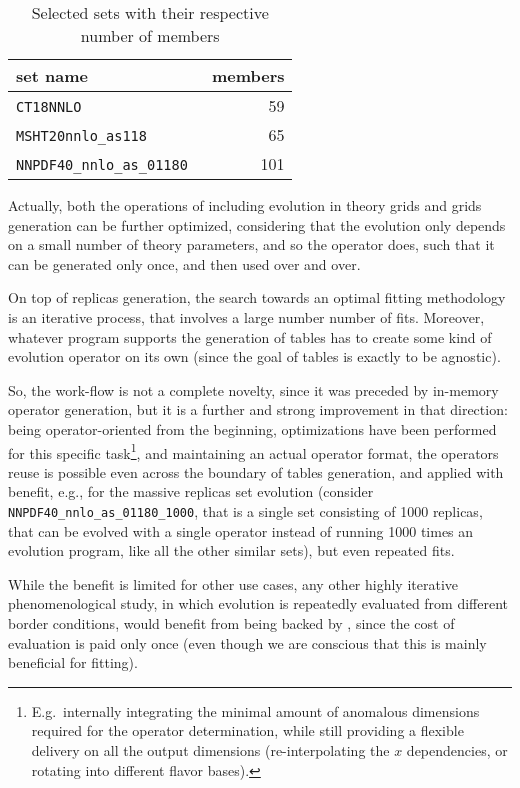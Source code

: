 \begin{table}
    \centering
    \begin{tabular}{lr}
        \pdf{} set name & members \\
        \hline
        \texttt{CT18NNLO}~\cite{Hou:2019efy} & 59\\
        \texttt{MSHT20nnlo\_as118}~\cite{Bailey:2020ooq} & 65\\
        \texttt{NNPDF40\_nnlo\_as\_01180}~\cite{NNPDF:2021njg} & 101
    \end{tabular}
    \caption{Selected \pdf{} sets with their respective number of members}
    \label{tab:eko/pdfmem}
\end{table}

Actually, both the operations of including evolution in theory grids and \pdf{}
grids generation can be further optimized, considering that the evolution only
depends on a small number of theory parameters, and so the operator does, such
that it can be generated only once, and then used over and over.

On top of replicas generation, the search towards an optimal fitting
methodology is an iterative process, that involves a large number number of fits.
Moreover, whatever program supports the generation of \fk{} tables has to
create some kind of evolution operator on its own (since the goal of \fk{}
tables is exactly to be \pdf{} agnostic).

So, the \eko{} work-flow is not a complete novelty, since it was preceded by
\apfel{} in-memory operator generation, but it is a further and strong
improvement in that direction: being operator-oriented from the beginning,
optimizations have been performed for this specific task\footnote{
E.g.\ internally integrating the minimal amount of anomalous dimensions required
for the operator determination, while still providing a flexible delivery on
all the output dimensions (re-interpolating the $x$ dependencies, or rotating
into different flavor bases).
}, and maintaining an
actual operator format, the operators reuse is possible even across the
boundary of \fk{} tables generation, and applied with benefit, e.g., for the
massive replicas set evolution (consider
\texttt{NNPDF40\_nnlo\_as\_01180\_1000}, that is a single set consisting of
1000 replicas, that can be evolved with a single operator instead of running
1000 times an evolution program, like all the other similar sets), but even
repeated fits.

While the benefit is limited for other use cases, any other highly iterative
phenomenological study, in which \pdf{} evolution is repeatedly evaluated from
different border conditions, would benefit from being backed by \eko{}, since
the cost of \dglap{} evaluation is paid only once (even though we are conscious
that this is mainly beneficial for \pdf{} fitting).

